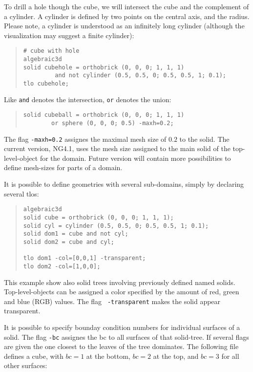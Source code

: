 \documentclass[12pt]{book}
\begin{document}
To drill a hole though the cube, we will intersect the cube
and the complement of a cylinder. A cylinder is defined by two points
on the central axis, and the radius.  Please note, a cylinder is
understood as an infinitely long cylinder (although the visualization
may suggest a finite cylinder):
\begin{quote}
\begin{verbatim}
# cube with hole
algebraic3d
solid cubehole = orthobrick (0, 0, 0; 1, 1, 1)
         and not cylinder (0.5, 0.5, 0; 0.5, 0.5, 1; 0.1);
tlo cubehole;
\end{verbatim}
\end{quote}

Like {\tt and} denotes the intersection, {\tt or} denotes the union:
\begin{quote}
\begin{verbatim}
solid cubeball = orthobrick (0, 0, 0; 1, 1, 1)
        or sphere (0, 0, 0; 0.5) -maxh=0.2;
\end{verbatim}
\end{quote}
The flag {\tt -maxh=0.2} assignes the maximal mesh size of $0.2$ to
the solid. The current version, NG4.1, uses the mesh size assigned to
the main solid of the top-level-object for the domain. Future version
will contain more possibilities to define mesh-sizes for parts of a
domain.

It is possible to define geometries with several sub-domains, simply
by declaring several tlos: 
\begin{quote}
\begin{verbatim}
algebraic3d
solid cube = orthobrick (0, 0, 0; 1, 1, 1);
solid cyl = cylinder (0.5, 0.5, 0; 0.5, 0.5, 1; 0.1);
solid dom1 = cube and not cyl;
solid dom2 = cube and cyl;

tlo dom1 -col=[0,0,1] -transparent;
tlo dom2 -col=[1,0,0];
\end{verbatim}
\end{quote}
This example show also solid trees involving previously defined named
solids. Top-level-objects can be assigned a color specified by the
amount of red, green and blue (RGB) values. The flag {\tt
  -transparent} makes the solid appear transparent.


It is possible to specify bounday condition numbers for individual
surfaces of a solid. The flag {\tt -bc} assignes the bc to all 
surfaces of that solid-tree. If several flags are given the one closest
to the leaves of the tree dominates. The following file defines a 
cube, with $bc=1$ at the bottom, $bc=2$ at the top, and $bc=3$ for 
all other surfaces:
\end{document}
